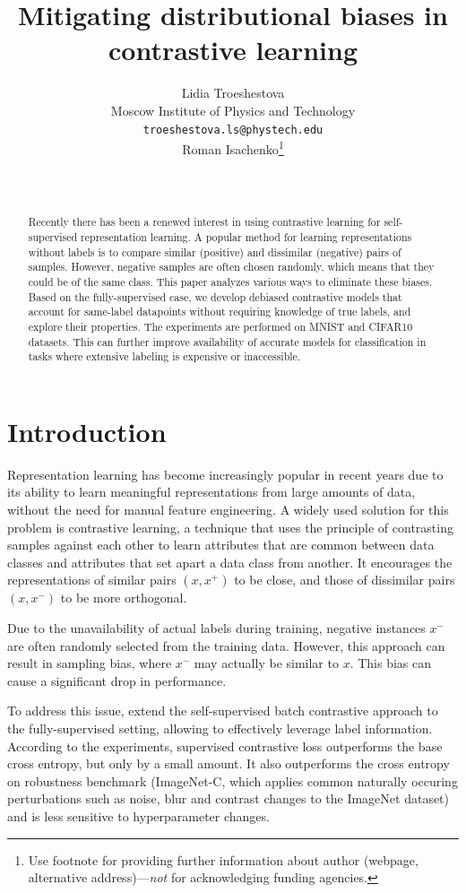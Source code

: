 \documentclass{article}
\title{Mitigating distributional biases in contrastive learning}
\author{ Lidia Troeshestova \\
	Moscow Institute of Physics and Technology\\
	\texttt{troeshestova.ls@phystech.edu} \\
	\And
	Roman Isachenko\thanks{Use footnote for providing further information about author (webpage, alternative address)---\emph{not} for acknowledging funding agencies.} \\
	   \\
	\texttt{} \\
}
\date{}
\begin{document}
\maketitle

\begin{abstract}
	Recently there has been a renewed interest in using contrastive learning for self-supervised representation learning. A popular method for learning representations without labels is to compare similar (positive) and dissimilar (negative) pairs of samples. However, negative samples are often chosen randomly, which means that they could be of the same class. This paper analyzes various ways to eliminate these biases. Based on the fully-supervised case, we develop debiased contrastive models that account for same-label datapoints without requiring knowledge of true labels, and explore their properties. The experiments are performed on MNIST and CIFAR10 datasets. This can further improve availability of accurate models for classification in tasks where extensive labeling is expensive or inaccessible.
\end{abstract}



\section{Introduction}
Representation learning has become increasingly popular in recent years due to its ability to learn meaningful representations from large amounts of data, without the need for manual feature engineering. A widely used solution for this problem is contrastive learning, a technique that uses the principle of contrasting samples against each other to learn attributes that are common between data classes and attributes that set apart a data class from another. It encourages the representations of similar pairs $(x, x^+)$ to be close, and those of dissimilar pairs $(x, x^-)$ to be more orthogonal.

Due to the unavailability of actual labels during training, negative instances $x^-$ are often randomly selected from the training data. However, this approach can result in sampling bias, where $x^-$ may actually be similar to $x$. This bias can cause a significant drop in performance. 

To address this issue, \citep{khosla2021supervised} extend the self-supervised batch contrastive approach to the fully-supervised setting, allowing to effectively leverage label information. According to the experiments, supervised contrastive loss outperforms the base cross entropy, but only by a small amount. It also outperforms the cross entropy on robustness benchmark (ImageNet-C, which applies common naturally occuring perturbations such as noise, blur and contrast changes to the ImageNet dataset) and is less sensitive to hyperparameter changes.
\end{document}

